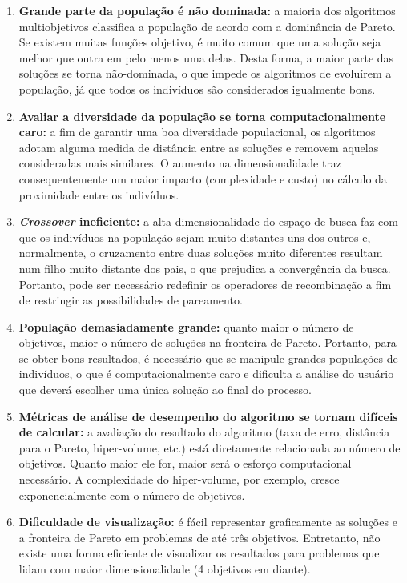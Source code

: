 \begin{enumerate}  
	\item \textbf{Grande parte da população é não dominada:} a maioria dos algoritmos multiobjetivos classifica a população de acordo com a dominância de Pareto. Se existem muitas funções objetivo, é muito comum que uma solução seja melhor que outra em pelo menos uma delas. Desta forma, a maior parte das soluções se torna não-dominada, o que impede os algoritmos de evoluírem a população, já que todos os indivíduos são considerados igualmente bons.
	\item \textbf{Avaliar a diversidade da população se torna computacionalmente caro:} a fim de garantir uma boa diversidade populacional, os algoritmos adotam alguma medida de distância entre as soluções e removem aquelas consideradas mais similares. O aumento na dimensionalidade traz consequentemente um maior impacto (complexidade e custo) no cálculo da proximidade entre os indivíduos. 
	\item \textbf{\textit{Crossover} ineficiente:} a alta dimensionalidade do espaço de busca faz com que os indivíduos na população sejam muito distantes uns dos outros e, normalmente, o cruzamento entre duas soluções muito diferentes resultam num filho muito distante dos pais, o que prejudica a convergência da busca. Portanto, pode ser necessário redefinir os operadores de recombinação a fim de restringir as possibilidades de pareamento.
	\item \textbf{População demasiadamente grande:} quanto maior o número de objetivos, maior o número de soluções na fronteira de Pareto. Portanto, para se obter bons resultados, é necessário que se manipule grandes populações de indivíduos, o que é computacionalmente caro e dificulta a análise do usuário que deverá escolher uma única solução ao final do processo.
	\item \textbf{Métricas de análise de desempenho do algoritmo se tornam difíceis de calcular:} a avaliação do resultado do algoritmo (taxa de erro, distância para o Pareto, hiper-volume, etc.) está diretamente relacionada ao número de objetivos. Quanto maior ele for, maior será o esforço computacional necessário. A complexidade do hiper-volume, por exemplo, cresce exponencialmente com o número de objetivos.
	\item \textbf{Dificuldade de visualização:} é fácil representar graficamente as soluções e a fronteira de Pareto em problemas de até três objetivos. Entretanto, não existe uma forma eficiente de visualizar os resultados para problemas que lidam com maior dimensionalidade (4 objetivos em diante).
\end{enumerate}

